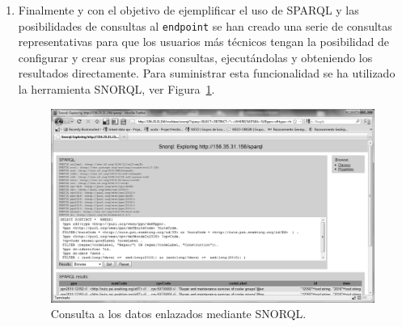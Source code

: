 \begin{enumerate}
\item Finalmente y con el objetivo de ejemplificar el uso de \gls{SPARQL} y las posibilidades 
de consultas al \texttt{endpoint} se han creado una serie de consultas representativas 
para que los usuarios más técnicos tengan la posibilidad de configurar y crear sus propias 
consultas, ejecutándolas y obteniendo los resultados directamente. Para suministrar esta funcionalidad 
se ha utilizado la herramienta \gls{SNORQL}, ver Figura~\ref{fig:moldeas-snorql-screen}.

\begin{figure}[!htb]
\centering
	\includegraphics[width=14cm]{images/phd/moldeas/moldeas-snorql}
\caption{Consulta a los datos enlazados mediante SNORQL.}
\label{fig:moldeas-snorql-screen}
\end{figure}



\end{enumerate}







